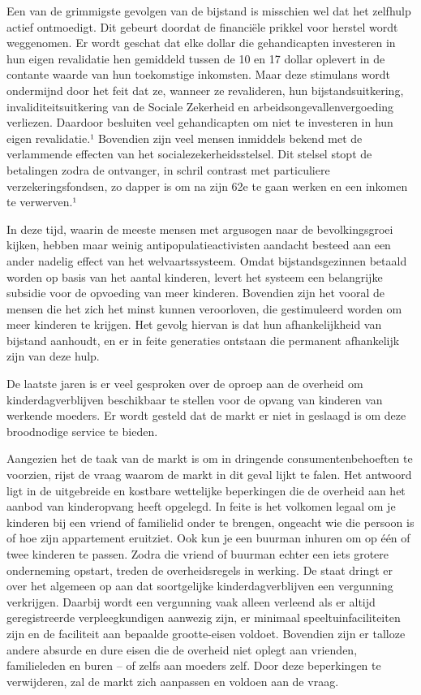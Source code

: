 \documentclass[
  a5paper,
  smalldemyvopaper,10pt,twoside,onecolumn,openright,extrafontsizes,hidelinks]{memoir}
\begin{document}
Een van de grimmigste gevolgen van de bijstand is misschien wel dat het
zelfhulp actief ontmoedigt. Dit gebeurt doordat de financiële prikkel
voor herstel wordt weggenomen. Er wordt geschat dat elke dollar die
gehandicapten investeren in hun eigen revalidatie hen gemiddeld tussen
de 10 en 17 dollar oplevert in de contante waarde van hun toekomstige
inkomsten. Maar deze stimulans wordt ondermijnd door het feit dat ze,
wanneer ze revalideren, hun bijstandsuitkering, invaliditeitsuitkering
van de Sociale Zekerheid en arbeidsongevallenvergoeding verliezen.
Daardoor besluiten veel gehandicapten om niet te investeren in hun eigen
revalidatie.¹ Bovendien zijn veel mensen inmiddels bekend met de
verlammende effecten van het socialezekerheidsstelsel. Dit stelsel stopt
de betalingen zodra de ontvanger, in schril contrast met particuliere
verzekeringsfondsen, zo dapper is om na zijn 62e te gaan werken en een
inkomen te verwerven.¹

In deze tijd, waarin de meeste mensen met argusogen naar de
bevolkingsgroei kijken, hebben maar weinig antipopulatieactivisten
aandacht besteed aan een ander nadelig effect van het welvaartssysteem.
Omdat bijstandsgezinnen betaald worden op basis van het aantal kinderen,
levert het systeem een belangrijke subsidie voor de opvoeding van meer
kinderen. Bovendien zijn het vooral de mensen die het zich het minst
kunnen veroorloven, die gestimuleerd worden om meer kinderen te krijgen.
Het gevolg hiervan is dat hun afhankelijkheid van bijstand aanhoudt, en
er in feite generaties ontstaan die permanent afhankelijk zijn van deze
hulp.

De laatste jaren is er veel gesproken over de oproep aan de overheid om
kinderdagverblijven beschikbaar te stellen voor de opvang van kinderen
van werkende moeders. Er wordt gesteld dat de markt er niet in geslaagd
is om deze broodnodige service te bieden.

Aangezien het de taak van de markt is om in dringende
consumentenbehoeften te voorzien, rijst de vraag waarom de markt in dit
geval lijkt te falen. Het antwoord ligt in de uitgebreide en kostbare
wettelijke beperkingen die de overheid aan het aanbod van kinderopvang
heeft opgelegd. In feite is het volkomen legaal om je kinderen bij een
vriend of familielid onder te brengen, ongeacht wie die persoon is of
hoe zijn appartement eruitziet. Ook kun je een buurman inhuren om op één
of twee kinderen te passen. Zodra die vriend of buurman echter een iets
grotere onderneming opstart, treden de overheidsregels in werking. De
staat dringt er over het algemeen op aan dat soortgelijke
kinderdagverblijven een vergunning verkrijgen. Daarbij wordt een
vergunning vaak alleen verleend als er altijd geregistreerde
verpleegkundigen aanwezig zijn, er minimaal speeltuinfaciliteiten zijn
en de faciliteit aan bepaalde grootte-eisen voldoet. Bovendien zijn er
talloze andere absurde en dure eisen die de overheid niet oplegt aan
vrienden, familieleden en buren -- of zelfs aan moeders zelf. Door deze
beperkingen te verwijderen, zal de markt zich aanpassen en voldoen aan
de vraag.
\end{document}
